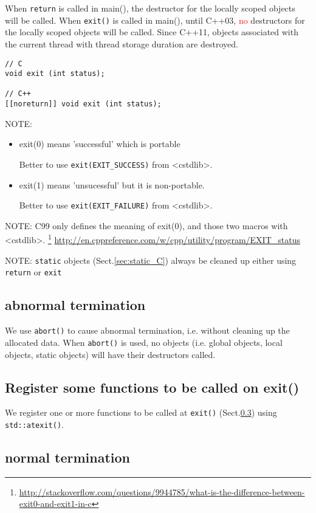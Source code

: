 When \verb!return! is called in main(), the destructor for the locally scoped
objects will be called. When \verb!exit()! is called in main(), until C++03,
\textcolor{red}{no} destructors for the locally scoped objects will be called.
Since C++11, objects associated with the current thread with thread storage
duration are destroyed. 
\begin{verbatim}
// C
void exit (int status);

// C++
[[noreturn]] void exit (int status);
\end{verbatim}
NOTE: 
\begin{itemize}
  \item exit(0) means 'successful' which is portable
  
Better to use \verb!exit(EXIT_SUCCESS)! from <cstdlib>.

  \item exit(1) means 'unsucessful' but it is non-portable. 

Better to use \verb!exit(EXIT_FAILURE)! from <cstdlib>.
\end{itemize}
NOTE: C99 only defines the meaning of exit(0), and those two macros with
<cstdlib>.
\footnote{\url{http://stackoverflow.com/questions/9944785/what-is-the-difference-between-exit0-and-exit1-in-c}}
\url{http://en.cppreference.com/w/cpp/utility/program/EXIT_status}

NOTE: \verb!static! objects (Sect.\ref{sec:static_C}) always be cleaned up either
using \verb!return! or \verb!exit! 

\subsection{abnormal termination}
\label{sec:abnormal_termination}

We use \verb!abort()! to cause abnormal termination, i.e. without cleaning up
the allocated data. When \verb!abort()! is used, no objects (i.e. global
objects, local objects, static objects) will have their destructors called. 

\subsection{Register some functions to be called on exit()}

We register one or more functions to be called at \verb!exit()!
(Sect.\ref{sec:normal_termination}) using \verb!std::atexit()!.

\subsection{normal termination}
\label{sec:normal_termination}

